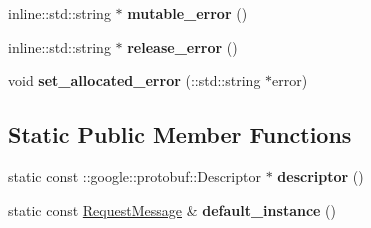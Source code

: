 \begin{DoxyCompactItemize}
\item 
\hypertarget{classmessaging_1_1RequestMessage_a6c0021c35cf315cdd62c58b9cc1a0492}{
inline::std::string $\ast$ {\bfseries mutable\_\-error} ()}
\label{classmessaging_1_1RequestMessage_a6c0021c35cf315cdd62c58b9cc1a0492}

\item 
\hypertarget{classmessaging_1_1RequestMessage_a82d180964442f2bcfd3357d690f9437b}{
inline::std::string $\ast$ {\bfseries release\_\-error} ()}
\label{classmessaging_1_1RequestMessage_a82d180964442f2bcfd3357d690f9437b}

\item 
\hypertarget{classmessaging_1_1RequestMessage_a7a0c0f9be6df1d35fa465815bc9d864c}{
void {\bfseries set\_\-allocated\_\-error} (::std::string $\ast$error)}
\label{classmessaging_1_1RequestMessage_a7a0c0f9be6df1d35fa465815bc9d864c}

\end{DoxyCompactItemize}
\subsection*{Static Public Member Functions}
\begin{DoxyCompactItemize}
\item 
\hypertarget{classmessaging_1_1RequestMessage_afddf1eabd783d362023788567f7c7531}{
static const ::google::protobuf::Descriptor $\ast$ {\bfseries descriptor} ()}
\label{classmessaging_1_1RequestMessage_afddf1eabd783d362023788567f7c7531}

\item 
\hypertarget{classmessaging_1_1RequestMessage_aea492c54cdb9f8f5c22ebb1b01cc467b}{
static const \hyperlink{classmessaging_1_1RequestMessage}{RequestMessage} \& {\bfseries default\_\-instance} ()}
\label{classmessaging_1_1RequestMessage_aea492c54cdb9f8f5c22ebb1b01cc467b}

\end{DoxyCompactItemize}

